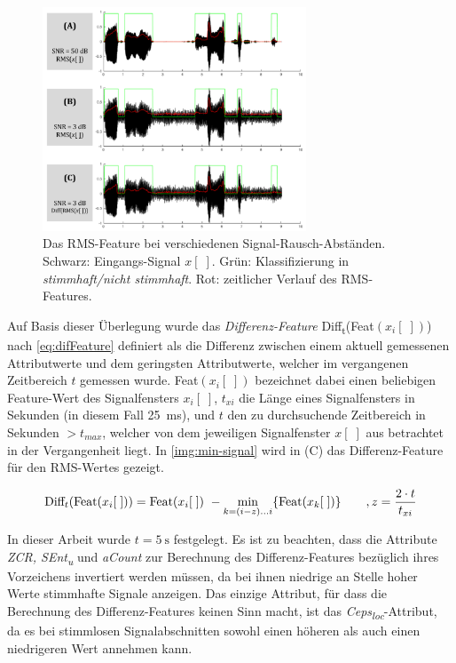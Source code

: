 \begin{figure}[h]
	\centering
	\includegraphics[width=0.7\textwidth]{bilder/rms_diff.png}
	\caption[Das RMS-Feature bei verschiedenen Signal-Rausch-Abständen]{Das RMS-Feature bei verschiedenen Signal-Rausch-Abständen. Schwarz: Eingangs-Signal $x[\;]$. Grün: Klassifizierung in \emph{stimmhaft/nicht stimmhaft}. Rot: zeitlicher Verlauf des RMS-Features.}
	\label{img:min-signal}
\end{figure}

Auf Basis dieser Überlegung wurde das \emph{Differenz-Feature} Diff\textsubscript{t}(Feat$(x_i[\;])$) nach \autoref{eq:difFeature} definiert als die Differenz zwischen einem aktuell gemessenen Attributwerte und dem geringsten Attributwerte, welcher im vergangenen Zeitbereich $t$ gemessen wurde. Feat$(x_i[\;])$ bezeichnet dabei einen beliebigen Feature-Wert des Signalfensters $x_i[\;]$, $t_{xi}$ die Länge eines Signalfensters in Sekunden (in diesem Fall \SI{25}{\milli\second}), und $t$ den zu durchsuchende Zeitbereich in Sekunden $> t_{max}$, welcher von dem jeweiligen Signalfenster $x[\;]$ aus betrachtet in der Vergangenheit liegt. In \autoref{img:min-signal} wird in (C) das Differenz-Feature für den RMS-Wertes gezeigt.

\begin{equation}
\text{Diff}_t(\text{Feat}(x_i[\;])) = \text{Feat}(x_i[\;])\ - \operatorname*{min}_{k=(i-z)...i}\{\text{Feat}(x_k[\;])\} \qquad , z = \frac{2 \cdot t}{t_{xi}}
\label{eq:difFeature}
\end{equation}

In dieser Arbeit wurde $t = \SI{5}{\second}$ festgelegt. Es ist zu beachten, dass die Attribute \emph{ZCR, SEnt\textsubscript{u}} und \emph{aCount} zur Berechnung des Differenz-Features bezüglich ihres Vorzeichens invertiert werden müssen, da bei ihnen niedrige an Stelle hoher Werte stimmhafte Signale anzeigen. Das einzige Attribut, für dass die Berechnung des Differenz-Features keinen Sinn macht, ist das \emph{Ceps\textsubscript{loc}}-Attribut, da es bei stimmlosen Signalabschnitten sowohl einen höheren als auch einen niedrigeren Wert annehmen kann.

